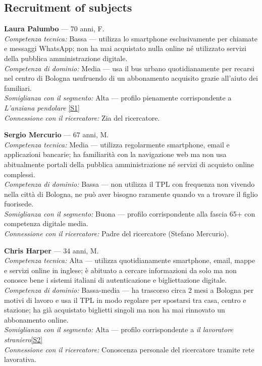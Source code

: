 \documentclass[11pt,a4paper]{article}
\begin{document}
\subsection*{Recruitment of subjects}
\begin{tcolorbox}[colback=backgroundColor,colframe=borderColor,arc=2mm]

\textbf{Laura Palumbo} --- 70 anni, F.\\[0.3cm]
\textit{Competenza tecnica:} Bassa --- utilizza lo smartphone
esclusivamente per chiamate e messaggi WhatsApp; non ha mai
acquistato nulla online né utilizzato servizi della pubblica
amministrazione digitale.\\[0.2cm]
\textit{Competenza di dominio:} Media --- usa il bus urbano
quotidianamente per recarsi nel centro di Bologna usufruendo
di un abbonamento acquisito grazie all'aiuto dei familiari.\\[0.2cm]
\textit{Somiglianza con il segmento:} Alta --- profilo
pienamente corrispondente a \textit{L'anziana pendolare}
\hyperref[seg:anziana]{[S1]}\\[0.2cm]
\textit{Connessione con il ricercatore:} Zia del ricercatore.

\vspace{0.2cm}

\textbf{Sergio Mercurio} --- 67 anni, M.\\[0.3cm]
\textit{Competenza tecnica:} Media --- utilizza regolarmente
smartphone, email e applicazioni bancarie; ha familiarità
con la navigazione web ma non usa abitualmente portali
della pubblica amministrazione né servizi di acquisto
online complessi.\\[0.2cm]
\textit{Competenza di dominio:} Bassa --- non utilizza
il TPL con frequenza non vivendo nella città di Bologna, ne può aver bisogno raramente quando va a trovare il figlio fuorisede.\\[0.2cm]
\textit{Somiglianza con il segmento:} Buona --- profilo
corrispondente alla fascia 65+ con competenza digitale media.\\[0.2cm]
\textit{Connessione con il ricercatore:} Padre del
ricercatore (Stefano Mercurio).

\vspace{0.2cm}

\textbf{Chris Harper} --- 34 anni, M.\\[0.3cm]
\textit{Competenza tecnica:} Alta --- utilizza quotidianamente
smartphone, email, mappe e servizi online in inglese; è abituato
a cercare informazioni da solo ma non conosce bene i sistemi
italiani di autenticazione e bigliettazione digitale.\\[0.2cm]
\textit{Competenza di dominio:} Bassa-media --- ha trascorso circa 2 mesi a Bologna per motivi di lavoro e usa il TPL in modo
regolare per spostarsi tra casa, centro e stazione; ha già
acquistato biglietti singoli ma non ha mai rinnovato un
abbonamento online.\\[0.2cm]
\textit{Somiglianza con il segmento:} Alta --- profilo
corrispondente a \textit{il lavoratore straniero}\hyperref[seg:straniero]{[S2]}\\[0.2cm]
\textit{Connessione con il ricercatore:} Conoscenza personale
del ricercatore tramite rete lavorativa.


\end{tcolorbox}
\end{document}
